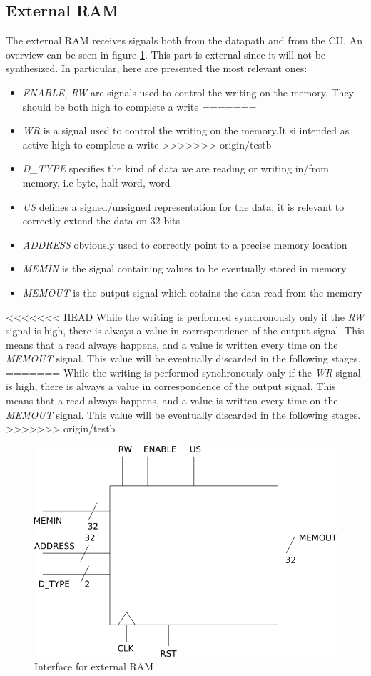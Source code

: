 \subsection{External RAM}
\label{ram}
The external RAM receives signals both from the datapath and from the CU. An overview can be seen in figure \ref{ext_ram_fig}. This part is external since it will not be synthesized. In particular, here are presented the most relevant ones:
\begin{itemize}
<<<<<<< HEAD
	\item \textit{ENABLE, RW} are signals used to control the writing on the memory. They should be both high to complete a write
=======
	\item \textit{WR} is a signal used to control the writing on the memory.It 
	si intended as active high to complete a write
>>>>>>> origin/testb
	\item \textit{D\_TYPE} specifies the kind of data we are reading or writing in/from memory, i.e byte, half-word, word
	\item \textit{US} defines a signed/unsigned representation for the data; it is relevant to correctly extend the data on 32 bits
	\item \textit{ADDRESS} obviously used to correctly point to a precise memory location
	\item \textit{MEMIN} is the signal containing values to be eventually stored in memory
	\item \textit{MEMOUT} is the output signal which cotains the data read from the memory
\end{itemize}

<<<<<<< HEAD
While the writing is performed synchronously only if the \textit{RW} signal is high, there is always a value in correspondence of the output signal. This means that a read always happens, and a value is written every time on the \textit{MEMOUT} signal. This value will be eventually discarded in the following stages.
=======
While the writing is performed synchronously only if the \textit{WR} signal is 
high, there is always a value in correspondence of the output signal. This 
means that a read always happens, and a value is written every time on the 
\textit{MEMOUT} signal. This value will be eventually discarded in the 
following stages.
>>>>>>> origin/testb

\begin{figure}
	\centering
	\includegraphics[scale=0.5]{chapters/figures/ram_ext}
	\caption{Interface for external RAM}
	\label{ext_ram_fig}
\end{figure} 
